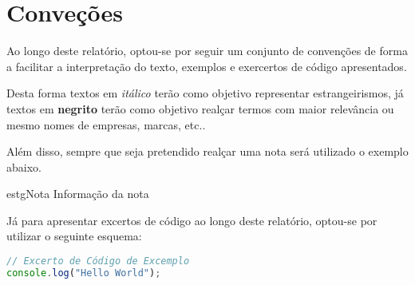 \chapter*{Conveções}

Ao longo deste relatório, optou-se por seguir um conjunto de convenções de forma a facilitar a interpretação do texto, exemplos e exercertos de código apresentados.

Desta forma textos em \textit{itálico} terão como objetivo representar estrangeirismos, já textos em \textbf{negrito} terão como objetivo realçar termos com maior relevância ou mesmo nomes de empresas, marcas, etc..

Além disso, sempre que seja pretendido realçar uma nota será utilizado o exemplo abaixo.\\[0.01cm]

\begin{mybox}{estg}{Nota}
	Informação da nota
\end{mybox}

\hspace{0.05cm}

Já para apresentar excertos de código ao longo deste relatório, optou-se por utilizar o seguinte esquema:\\[0.01cm]

\begin{lstlisting}[language=Javascript]
// Excerto de Código de Excemplo
console.log("Hello World");
\end{lstlisting}
